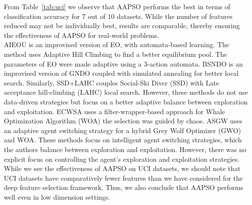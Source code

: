 \documentclass[final,3p,times]{elsarticle}
\begin{document}
{From Table~\ref{tab:uci} we observe that AAPSO performs the best in terms of classification accuracy for 7 out of 10 datasets. While the number of features reduced may not be individually best, results are comparable, thereby ensuring the effectiveness of AAPSO for real-world problems.\\
AIEOU is an improvised version of EO, with {automata-based learning}. The method uses Adaptive  Hill Climbing  to find a better {equilibrium} pool. The parameters of EO {were} made adaptive using a 3-action automata. BSNDO is an improvised version of GNDO coupled with simulated annealing for better local search. {Similarly,} SSD+LAHC couples Social-Ski Diver (SSD) with Late acceptance hill-climbing (LAHC) local search. {However,} these methods do not use {data-driven strategies} but focus on a better adaptive balance between exploration and exploitation. ECWSA uses a filter-wrapper-based approach for Whale Optimization Algorithm (WOA) the selection was guided by chaos. ASGW uses an adaptive agent switching strategy for a hybrid Grey Wolf Optimizer (GWO) and WOA. {These} methods focus on intelligent agent switching strategies, which the authors balance between exploration and exploitation. However, there was no explicit focus on controlling the agent's exploration and exploitation strategies.\\
While we see the effectiveness of AAPSO on UCI datasets, {we} should {note} that UCI datasets have comparatively fewer features than we have considered for the deep feature selection framework. Thus, we also conclude that AAPSO performs well even in low dimension settings.}
\end{document}
